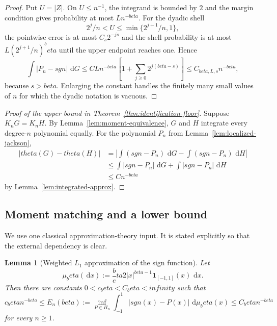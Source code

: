 \documentclass[11pt]{article}
\def\beta{beta}%
\def\theta{theta}%
\def\sgn{sgn}%
\def\infty{infinity}%
\newtheorem{lemma}[theorem]{Lemma}
\newcommand{\one}{\mathbf 1}
\newcommand{\sgn}{\operatorname{sgn}}
\newcommand{\dd}{\,\mathrm d}
\begin{document}
\begin{proof}
Put $U=|Z|$.  On $U\le n^{-1}$, the integrand is bounded by $2$ and the margin condition gives probability at most $Ln^{-\beta}$.  For the dyadic shell
\[
2^j/n<U\le \min\{2^{j+1}/n,1\},
\]
the pointwise error is at most $C_s2^{-js}$ and the shell probability is at most $L(2^{j+1}/n)^\beta$ until the upper endpoint reaches one.  Hence
\[
\int|P_n-\sgn|\,\dd G
\le CLn^{-\beta}
\left[1+\sum_{j\ge0}2^{j(\beta-s)}\right]
\le C_{\beta,L,s}n^{-\beta},
\]
because $s>\beta$.  Enlarging the constant handles the finitely many small values of $n$ for which the dyadic notation is vacuous.
\end{proof}

\begin{proof}[Proof of the upper bound in Theorem~\ref{thm:identification-floor}]
Suppose $K_nG=K_nH$.  By Lemma~\ref{lem:moment-equivalence}, $G$ and $H$ integrate every degree-$n$ polynomial equally.  For the polynomial $P_n$ from Lemma~\ref{lem:localized-jackson},
\begin{align*}
|\theta(G)-\theta(H)|
&=\left|\int(\sgn-P_n)\,\dd G
      -\int(\sgn-P_n)\,\dd H\right|\\
&\le
\int|\sgn-P_n|\,\dd G
+
\int|\sgn-P_n|\,\dd H\\
&\le Cn^{-\beta}
\end{align*}
by Lemma~\ref{lem:integrated-approx}.
\end{proof}

\subsection{Moment matching and a lower bound}

We use one classical approximation-theory input.  It is stated explicitly so that the external dependency is clear.

\begin{lemma}[Weighted $L_1$ approximation of the sign function]
\label{lem:weighted-sign}
Let
\[
\mu_\beta(\dd x)
:=\frac\beta2|x|^{\beta-1}\one_{[-1,1]}(x)\,\dd x.
\]
Then there are constants $0<c_\beta<C_\beta<\infty$ such that
\begin{equation}
\label{eq:weighted-sign-rate}
c_\beta n^{-\beta}
\le
E_n(\beta)
:=
\inf_{P\in\Pi_n}
\int_{-1}^1|\sgn(x)-P(x)|\,\dd\mu_\beta(x)
\le
C_\beta n^{-\beta}
\end{equation}
for every $n\ge1$.
\end{lemma}
\end{document}
